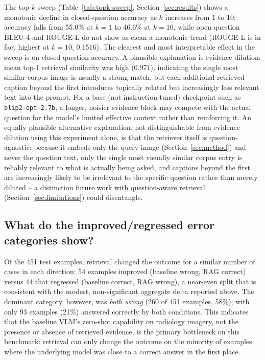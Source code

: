 The top-$k$ sweep (Table~\ref{tab:topk-sweep}, Section~\ref{sec:results}) shows a
monotonic decline in closed-question accuracy as $k$ increases from 1 to 10:
accuracy falls from 55.0\% at $k=1$ to 46.6\% at $k=10$, while
open-question BLEU-4 and ROUGE-L do not show as clean a monotonic trend
(ROUGE-L is in fact highest at $k=10$, 0.1516). The clearest and most
interpretable effect in the sweep is on closed-question accuracy. A
plausible explanation is evidence dilution: mean top-1 retrieval
similarity was high (0.971), indicating the single most similar corpus
image is usually a strong match, but each additional retrieved caption
beyond the first introduces topically related but increasingly less
relevant text into the prompt. For a base (not instruction-tuned)
checkpoint such as \texttt{blip2-opt-2.7b}, a longer, noisier evidence
block may compete with the actual question for the model's limited
effective context rather than reinforcing it. An equally plausible
alternative explanation, not distinguishable from evidence dilution using
this experiment alone, is that the retriever itself is question-agnostic:
because it embeds only the query image (Section~\ref{sec:method}) and never
the question text, only the single most visually similar corpus entry is
reliably relevant to what is actually being asked, and captions beyond the
first are increasingly likely to be irrelevant to the specific question
rather than merely diluted -- a distinction future work with
question-aware retrieval (Section~\ref{sec:limitations}) could disentangle.

\subsection{What do the improved/regressed error categories show?}

Of the 451 test examples, retrieval changed the outcome for a similar
number of cases in each direction: 54 examples improved (baseline wrong,
RAG correct) versus 44 that regressed (baseline correct, RAG wrong), a
near-even split that is consistent with the modest, non-significant
aggregate delta reported above. The dominant category, however, was
\emph{both wrong} (260 of 451 examples, 58\%), with only 93 examples
(21\%) answered correctly by both conditions. This indicates that the
baseline VLM's zero-shot capability on radiology imagery, not the
presence or absence of retrieved evidence, is the primary bottleneck on
this benchmark: retrieval can only change the outcome on the minority of
examples where the underlying model was close to a correct answer in the
first place.

